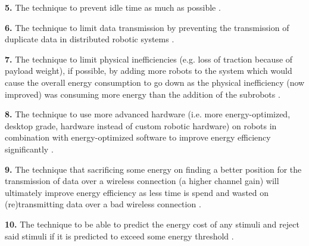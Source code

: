 \vspace{2mm}

\textbf{5.} The technique to prevent idle time as much as possible \cite{gurel2019industrial_robot_scheduling, 
kaitwanidvilai2020industrial_robot_cycle_time, wingstrom2013robot_cell_scheduling}.
    
\vspace{2mm}

\textbf{6.} The technique to limit data transmission by preventing the transmission of duplicate data in distributed robotic systems \cite{huh2013distributed_swarm}.

\vspace{2mm}

\textbf{7.} The technique to limit physical inefficiencies (e.g. loss of traction because of payload weight), if possible, by adding more robots to the system which would cause the overall
energy consumption to go down as the physical inefficiency (now improved) was consuming more energy than the addition of the subrobots \cite{kim2016firefighting_robot}.
    
\vspace{2mm}

\textbf{8.} The technique to use more advanced hardware (i.e. more energy-optimized, desktop grade, hardware instead of custom robotic hardware) 
on robots in combination with energy-optimized software to improve energy efficiency significantly \cite{cheng2018FPGA_image_recognition}.
    
\vspace{2mm}

\textbf{9.} The technique that sacrificing some energy on finding a better position for the transmission of data over a wireless connection
(a higher channel gain) will ultimately improve energy efficiency as less time is spend and wasted on (re)transmitting 
data over a bad wireless connection \cite{licea2013wireless_comms}.

\vspace{2mm}

\textbf{10.} The technique to be able to predict the energy cost of any stimuli and reject said stimuli if it is predicted to exceed some energy threshold 
\cite{kirtay2013humanoid_emotion}.

